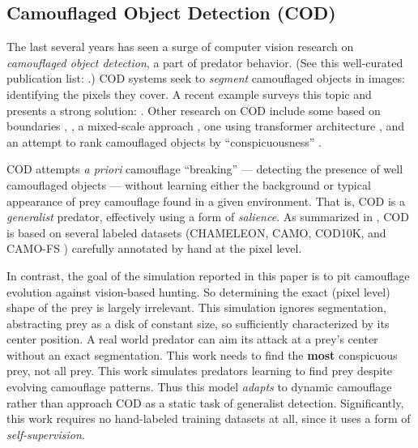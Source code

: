 \documentclass[letterpaper]{article}
\newcommand{\jargon}[1]{\textit{#1}}
\begin{document}
\subsection{Camouflaged Object Detection (COD)}
The last several years has seen a surge of computer vision research on \jargon{camouflaged object detection}, a part of predator behavior. (See this well-curated publication list: \citet{visionxiang_cod}.) COD systems seek to \jargon{segment} camouflaged objects in images: identifying the pixels they cover. A recent example surveys this topic and presents a strong solution: \citet{Zhang2022}. Other research on COD include some based on boundaries \citep{chen_boundary-guided_2022}, \citep{sun_boundary-guided_2022}, a mixed-scale approach \citep{pang_zoom_2022}, one using transformer architecture \citep{yin_camoformer_2022}, and an attempt to rank camouflaged objects by “conspicuousness” \citep{lv_cod_2022}.
\par
COD attempts \textit{a priori} camouflage “breaking” — detecting the presence of well camouflaged objects — without learning either the background or typical appearance of prey camouflage found in a given environment. That is, COD is a \jargon{generalist} predator, effectively using a form of \jargon{salience}. As summarized in \citet{Zhang2022}, COD is based on several labeled datasets (CHAMELEON, CAMO, COD10K, and CAMO-FS \citep{nguyen_few-shot_2023}) carefully annotated by hand at the pixel level.
\par
In contrast, the goal of the simulation reported in this paper is to pit camouflage evolution against vision-based hunting. So determining the exact (pixel level) shape of the prey is largely irrelevant. This simulation ignores segmentation, abstracting prey as a disk of constant size, so sufficiently characterized by its center position. A real world predator can aim its attack at a prey's center without an exact segmentation. This work needs to find the \textbf{most} conspicuous prey, not all prey. This work simulates predators learning to find prey despite evolving camouflage patterns. Thus this model \jargon{adapts} to dynamic camouflage rather than approach COD as a static task of generalist detection. Significantly, this work requires no hand-labeled training datasets at all, since it uses a form of \jargon{self-supervision}.
\par

\end{document}
